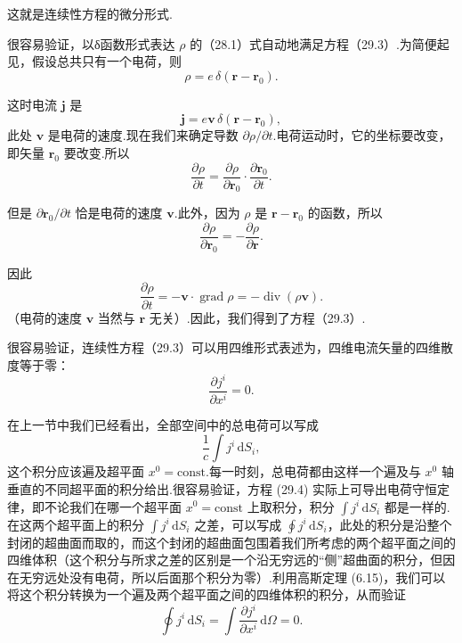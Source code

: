 这就是连续性方程的微分形式.

很容易验证，以δ函数形式表达 $\rho$ 的（28.1）式自动地满足方程（29.3）.为简便起见，假设总共只有一个电荷，则
\begin{equation*}
  \rho=e\,\delta(\boldsymbol{r}-\boldsymbol{r}_0).
\end{equation*}

这时电流 $\boldsymbol{j}$ 是
\begin{equation*}
  \boldsymbol{j}=e\boldsymbol{v}\,\delta(\boldsymbol{r}-\boldsymbol{r}_0),
\end{equation*}
此处 $\boldsymbol{v}$ 是电荷的速度.现在我们来确定导数 $\partial\rho/\partial t$.电荷运动时，它的坐标要改变，即矢量
$\boldsymbol{r}_0$ 要改变.所以
\begin{equation*}
  \frac{\partial\rho}{\partial t}
  =\frac{\partial\rho}{\partial\boldsymbol{r}_0}
  \cdot\frac{\partial\boldsymbol{r}_0}{\partial t}.
\end{equation*}

但是 $\partial\boldsymbol{r}_0/\partial t$ 恰是电荷的速度 $\boldsymbol{v}$.此外，因为
$\rho$ 是 $\boldsymbol{r}-\boldsymbol{r}_0$ 的函数，所以
\begin{equation*}
  \frac{\partial\rho}{\partial\boldsymbol{r}_0}
  =-\frac{\partial\rho}{\partial\boldsymbol{r}}.
\end{equation*}

因此
\begin{equation*}
  \frac{\partial\rho}{\partial t}
  =-\boldsymbol{v}\cdot\operatorname{grad}\rho
  =-\operatorname{div}(\rho\boldsymbol{v}).
\end{equation*}
（电荷的速度 $\boldsymbol{v}$ 当然与 $\boldsymbol{r}$ 无关）.因此，我们得到了方程（29.3）.

很容易验证，连续性方程（29.3）可以用四维形式表述为，四维电流矢量的四维散度等于零：
\begin{equation}
  \frac{\partial j^i}{\partial x^i}=0.
\end{equation}

在上一节中我们已经看出，全部空间中的总电荷可以写成
\begin{equation*}
  \frac{1}{c}\int j^i\,\mathrm{d}S_i,
\end{equation*}
这个积分应该遍及超平面 $x^0=\mathrm{const}$.每一时刻，总电荷都由这样一个遍及与 $x^0$
轴垂直的不同超平面的积分给出.很容易验证，方程 (29.4) 实际上可导出电荷守恒定律，即不论我们在哪一个超平面
$x^0=\mathrm{const}$ 上取积分，积分 $\int j^i\,\mathrm{d}S_i$
都是一样的.在这两个超平面上的积分 $\int j^i\,\mathrm{d}S_i$ 之差，可以写成
$\oint j^i\,\mathrm{d}S_i$，此处的积分是沿整个封闭的超曲面而取的，而这个封闭的超曲面包围着我们所考虑的两个超平面之间的四维体积（这个积分与所求之差的区别是一个沿无穷远的“侧”超曲面的积分，但因在无穷远处没有电荷，所以后面那个积分为零）.利用高斯定理
(6.15)，我们可以将这个积分转换为一个遍及两个超平面之间的四维体积的积分，从而验证
\begin{equation}
  \oint j^i\,\mathrm{d}S_i
  =\int\frac{\partial j^i}{\partial x^i}\,\mathrm{d}\varOmega=0.
\end{equation}

